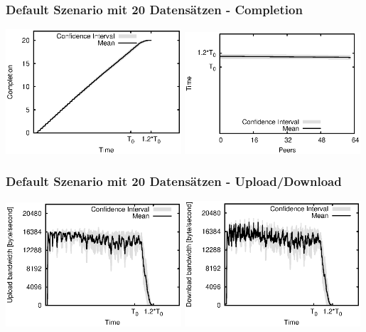 \begin{frame}
  \frametitle{Default Szenario mit 20 Datensätzen - Completion}
  \begin{center}
    \includegraphics[width=0.49\textwidth]{fig/plots/scenario_6_parts_20/plots/GeneratedMeanChunkCompletion.csv.eps}
    \hfill
    \includegraphics[width=0.49\textwidth]{fig/plots/scenario_6_parts_20/plots/GeneratedMeanSortedChunkCompletion.csv.eps}
  \end{center}
\end{frame}


\begin{frame}
  \frametitle{Default Szenario mit 20 Datensätzen - Upload/Download}
  \begin{center}
    \includegraphics[width=0.49\textwidth]{fig/plots/scenario_6_parts_20/plots/GeneratedMeanCurrentUploadBandwidth.csv.eps}
    \includegraphics[width=0.49\textwidth]{fig/plots/scenario_6_parts_20/plots/GeneratedMeanCurrentDownloadBandwidth.csv.eps}
  \end{center}
\end{frame}


